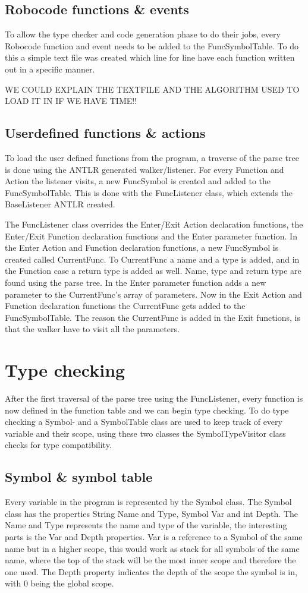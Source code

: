 \subsection{Robocode functions \& events}
To allow the type checker and code generation phase to do their jobs, every Robocode function and event needs to be added to the FuncSymbolTable. To do this a simple text file was created which line for line have each function written out in a specific manner. 

WE COULD EXPLAIN THE TEXTFILE AND THE ALGORITHM USED TO LOAD IT IN IF WE HAVE TIME!!

\subsection{Userdefined functions \& actions}
To load the user defined functions from the program, a traverse of the parse tree is done using the ANTLR generated walker/listener. For every Function and Action the listener visits, a new FuncSymbol is created and added to the FuncSymbolTable. This is done with the FuncListener class, which extends the BaseListener ANTLR created.
 
The FuncListener class overrides the Enter/Exit Action declaration functions, the Enter/Exit Function declaration functions and the Enter parameter function. In the Enter Action and Function declaration functions, a new FuncSymbol is created called CurrentFunc. To CurrentFunc a name and a type is added, and in the Function case a return type is added as well. Name, type and return type are found using the parse tree.
In the Enter parameter function adds a new parameter to the CurrentFunc's array of parameters. 
Now in the Exit Action and Function declaration functions the CurrentFunc gets added to the FuncSymbolTable. 
The reason the CurrentFunc is added in the Exit functions, is that the walker have to visit all the parameters. 

\section{Type checking} 
After the first traversal of the parse tree using the FuncListener, every function is now defined in the function table and we can begin type checking. To do type checking a Symbol- and a SymbolTable class are used to keep track of every variable and their scope, using these two classes the SymbolTypeVisitor class checks for type compatibility. 

\subsection{Symbol \& symbol table}
Every variable in the program is represented by the Symbol class. The Symbol class has the properties String Name and Type, Symbol Var and int Depth. The Name and Type represents the name and type of the variable, the interesting parts is the Var and Depth properties. Var is a reference to a Symbol of the same name but in a higher scope, this would work as stack for all symbols of the same name, where the top of the stack will be the most inner scope and therefore the one used. The Depth property indicates the depth of the scope the symbol is in, with 0 being the global scope. 

